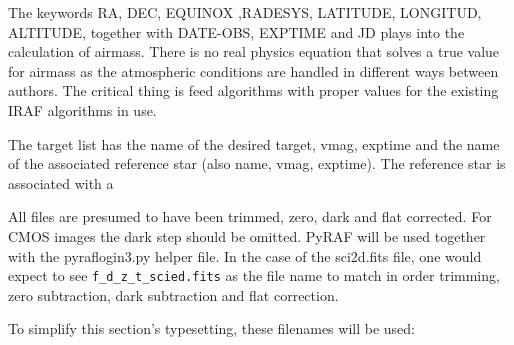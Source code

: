 The keywords RA, DEC, EQUINOX ,RADESYS, LATITUDE, LONGITUD, ALTITUDE,
together with DATE-OBS, EXPTIME and JD plays into the calculation of
airmass. There is no real physics equation that solves a true value
for airmass as the atmospheric conditions are handled in different
ways between authors. The critical thing is feed algorithms with
proper values for the existing IRAF algorithms in use.

The target list has the name of the desired target, vmag, exptime and the
name of the associated reference star (also name, vmag, exptime). The
reference star is associated with a 

All files are presumed to have been trimmed, zero, dark and flat corrected.
For CMOS images the dark step should be omitted. PyRAF will be used
together with the pyraflogin3.py helper file. In the case of the sci2d.fits
file, one would expect to see \verb=f_d_z_t_scied.fits= as the file name
to match in order trimming, zero subtraction, dark subtraction and flat
correction. 

To simplify this section's typesetting, these filenames will be used:

